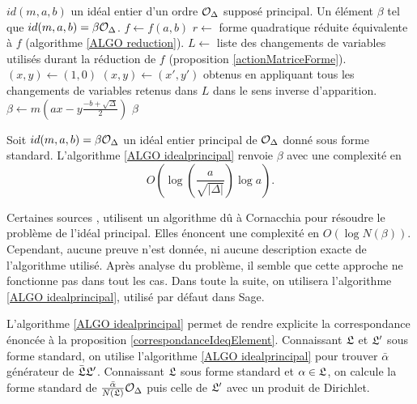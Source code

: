 \begin{algorithm}[h]
	\caption{Générateur d'un idéal principal donné sous forme standard}
	\label{ALGO idealprincipal}
	\begin{algorithmic}[1]
		\Require $id(m,a,b)$ un idéal entier d'un ordre $\mathcal{O}_{\Delta}$ supposé principal.
		\Ensure Un élément $\beta$ tel que $id(m,a,b) = \beta\mathcal{O}_{\Delta}$. 
		\State $f\gets f(a,b)$
		\State $r\gets$ forme quadratique réduite équivalente à $f$ (algorithme \ref{ALGO reduction}).
		\State $L\gets$ liste des changements de variables utilisés durant la réduction de $f$ (proposition \ref{actionMatriceForme}).
		\State $(x,y)\gets(1,0)$
		\State $(x,y)\gets(x',y')$ obtenus en appliquant tous les changements de variables retenus dans $L$ dans le sens inverse d'apparition.
		\State $\beta\gets m\left( ax - y\frac{-b + \sqrt{\Delta}}{2}\right)$
		\State \Return $\beta$
	\end{algorithmic}
\end{algorithm}


\begin{Prop}\label{COMPLEX idealprincipal}
	Soit $id(m,a,b) = \beta\mathcal{O}_{\Delta}$ un idéal entier principal de $\mathcal{O}_{\Delta}$ donné sous forme standard. L'algorithme \ref{ALGO idealprincipal} renvoie $\beta$ avec une complexité en
	\begin{equation*}
		O\left( \log\left( \frac{a}{\sqrt{|\Delta|}} \right)\log a\right).
	\end{equation*}
\end{Prop}


\begin{Rem}
	Certaines sources \cite{BrokerCharlesLauter}, \cite{JaoSoukharev} utilisent un algorithme dû à Cornacchia pour résoudre le problème de l'idéal principal. Elles énoncent une complexité en $O(\log N(\beta))$. Cependant, aucune preuve n'est donnée, ni aucune description exacte de l'algorithme utilisé. Après analyse du problème, il semble que cette approche ne fonctionne pas dans tout les cas. Dans toute la suite, on utilisera l'algorithme \ref{ALGO idealprincipal}, utilisé par défaut dans Sage. 
\end{Rem}

\begin{Rem}
	L'algorithme \ref{ALGO idealprincipal} permet de rendre explicite la correspondance énoncée à la proposition \ref{correspondanceIdeqElement}. Connaissant $\mathfrak{L}$ et $\mathfrak{L}'$ sous forme standard, on utilise l'algorithme \ref{ALGO idealprincipal} pour trouver $\bar{\alpha}$ générateur de $\bar{\mathfrak{L}}\mathfrak{L}'$. Connaissant $\mathfrak{L}$ sous forme standard et $\alpha\in\mathfrak{L}$, on calcule la forme standard de $\frac{\bar\alpha}{N(\mathfrak{L})}\mathcal{O}_{\Delta}$ puis celle de $\mathfrak{L}'$ avec un produit de Dirichlet.
\end{Rem}

